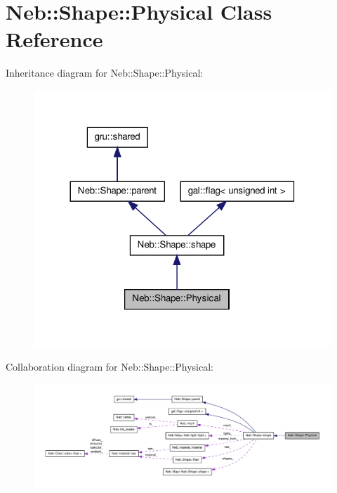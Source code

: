 \hypertarget{classNeb_1_1Shape_1_1Physical}{\section{\-Neb\-:\-:\-Shape\-:\-:\-Physical \-Class \-Reference}
\label{classNeb_1_1Shape_1_1Physical}
}


\-Inheritance diagram for \-Neb\-:\-:\-Shape\-:\-:\-Physical\-:\nopagebreak
\begin{figure}[H]
\begin{center}
\leavevmode
\includegraphics[width=320pt]{classNeb_1_1Shape_1_1Physical__inherit__graph}
\end{center}
\end{figure}


\-Collaboration diagram for \-Neb\-:\-:\-Shape\-:\-:\-Physical\-:\nopagebreak
\begin{figure}[H]
\begin{center}
\leavevmode
\includegraphics[width=350pt]{classNeb_1_1Shape_1_1Physical__coll__graph}
\end{center}
\end{figure}
